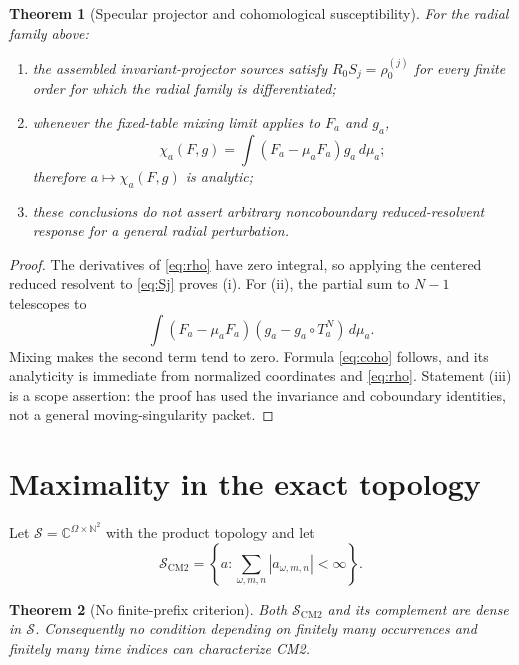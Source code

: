 \documentclass[11pt,reqno]{amsart}
\newtheorem{theorem}{Theorem}[section]
\theoremstyle{definition}
\theoremstyle{remark}
\newcommand{\C}{\mathbb C}
\newcommand{\N}{\mathbb N}
\newcommand{\abs}[1]{\left\lvert #1\right\rvert}
\begin{document}
\begin{theorem}[Specular projector and cohomological susceptibility]\label{thm:specular}
For the radial family above:
\begin{enumerate}[label=(\roman*)]
\item the assembled invariant-projector sources satisfy
$R_0S_j=\rho_0^{(j)}$ for every finite order for which the radial family is
differentiated;
\item whenever the fixed-table mixing limit applies to $F_a$ and $g_a$,
\begin{equation}\label{eq:coho}
 \chi_a(F,g)=
 \int(F_a-\mu_aF_a)g_a\,d\mu_a;
\end{equation}
therefore $a\mapsto\chi_a(F,g)$ is analytic;
\item these conclusions do not assert arbitrary noncoboundary reduced-resolvent
response for a general radial perturbation.
\end{enumerate}
\end{theorem}

\begin{proof}
The derivatives of \eqref{eq:rho} have zero integral, so applying the centered
reduced resolvent to \eqref{eq:Sj} proves (i).  For (ii), the partial sum to
$N-1$ telescopes to
\[
 \int(F_a-\mu_aF_a)
       (g_a-g_a\circ T_a^N)\,d\mu_a.
\]
Mixing makes the second term tend to zero.  Formula \eqref{eq:coho} follows,
and its analyticity is immediate from normalized coordinates and
\eqref{eq:rho}.  Statement (iii) is a scope assertion: the proof has used the
invariance and coboundary identities, not a general moving-singularity packet.
\end{proof}

\section{Maximality in the exact topology}\label{sec:maximality}

Let $\mathscr S=\C^{\Omega\times\N^2}$ with the product topology and let
\[
 \mathscr S_{\mathrm{CM2}}=
 \left\{a:\sum_{\omega,m,n}\abs{a_{\omega,m,n}}<\infty\right\}.
\]

\begin{theorem}[No finite-prefix criterion]\label{thm:maximality}
Both $\mathscr S_{\mathrm{CM2}}$ and its complement are dense in
$\mathscr S$.  Consequently no condition depending on finitely many
occurrences and finitely many time indices can characterize CM2.
\end{theorem}
\end{document}
